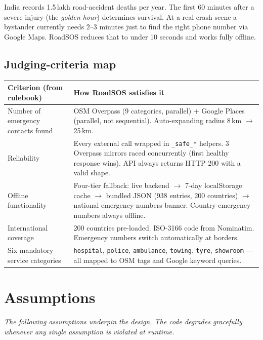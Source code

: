 \documentclass[11pt, a4paper]{article}
\newcommand{\code}[1]{\texttt{\small#1}}
\begin{document}
India records 1.5\,lakh road-accident deaths per year. The first 60 minutes after a severe
injury (the \emph{golden hour}) determines survival. At a real crash scene a bystander
currently needs 2--3 minutes just to find the right phone number via Google Maps.
RoadSOS reduces that to under 10 seconds and works fully offline.

\subsection{Judging-criteria map}

\begin{tabularx}{\textwidth}{lX}
\toprule
\textbf{Criterion (from rulebook)} & \textbf{How RoadSOS satisfies it} \\
\midrule
Number of emergency contacts found &
  OSM Overpass (9 categories, parallel) + Google Places (parallel, not sequential).
  Auto-expanding radius 8\,km $\to$ 25\,km. \\
Reliability &
  Every external call wrapped in \code{\_safe\_*} helpers. 3 Overpass mirrors raced concurrently (first healthy response wins). API always returns HTTP 200 with a valid shape. \\
Offline functionality &
  Four-tier fallback: live backend $\to$ 7-day localStorage cache $\to$ bundled JSON
  (938 entries, 200 countries) $\to$ national emergency-numbers banner. Country emergency numbers
  always offline. \\
International coverage &
  200 countries pre-loaded. ISO-3166 code from Nominatim. Emergency numbers switch
  automatically at borders. \\
Six mandatory service categories &
  \code{hospital}, \code{police}, \code{ambulance}, \code{towing}, \code{tyre},
  \code{showroom} --- all mapped to OSM tags and Google keyword queries. \\
\bottomrule
\end{tabularx}


\section{Assumptions}

\textit{The following assumptions underpin the design.  The code degrades gracefully
whenever any single assumption is violated at runtime.}
\end{document}
